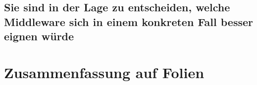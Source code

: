 \documentclass[a4paper]{article}
\begin{document}
		
		
		\subsection{Sie sind in der Lage zu entscheiden, welche Middleware sich in einem konkreten Fall besser eignen würde}
		
		
		
		
	\newpage	
	\section{Zusammenfassung auf Folien}
	
		
		
		
	\newpage
		
	
		
		
\end{document}
